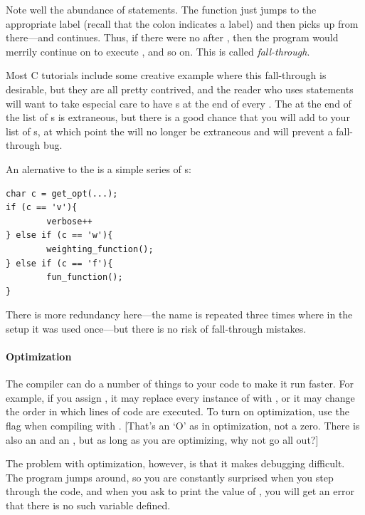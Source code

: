 \documentclass[12pt]{article}
\makeatletter
\def\ind#1{\index{#1}#1}
\def\ttind#1{\index{#1@\cinline{#1}}\cinline{#1}}
\makeatother
\begin{document}
Note well the abundance of  statements.  The 
function just jumps to the appropriate label (recall that the colon
indicates a label) and then picks up from there---and continues. Thus,
if there were no  after , then the program
would merrily continue on to execute , and so
on. This is called {\sl fall-through}.

Most C tutorials include some creative example where this
fall-through is desirable, but they are all pretty contrived, and the
reader who uses  statements will want to take especial care
to have s at the end of every .  The 
at the end of the list of s is extraneous, but there is a good
chance that you will add to your list of s, at which point
the  will no longer be extraneous and will prevent a fall-through bug.

An alernative to the  is a simple series of s:
\begin{lstlisting}
char c = get_opt(...);
if (c == 'v'){
        verbose++
} else if (c == 'w'){
        weighting_function();
} else if (c == 'f'){
        fun_function();
}
\end{lstlisting}
There is more redundancy here---the name  is repeated three times
where in the  setup it was used once---but there is no risk
of fall-through mistakes.


\paragraph{Optimization} 
The \ttind{gcc} compiler can do a number of things to your code to make it
run faster. For example, if you assign , it may replace
every instance of  with , or it may change the order
in which lines of code are executed. To turn on \ind{optimization},
use the  flag when compiling with . [That's an `O'
as in optimization, not a zero. There is also an  and an , but as long as you are optimizing, why not go all out?]

The problem with optimization, however, is that it makes debugging
difficult. The program jumps around, so you are constantly surprised when
you step through the code, and when you ask to print the value of , you will get an error that there is no such variable defined.
\end{document}
